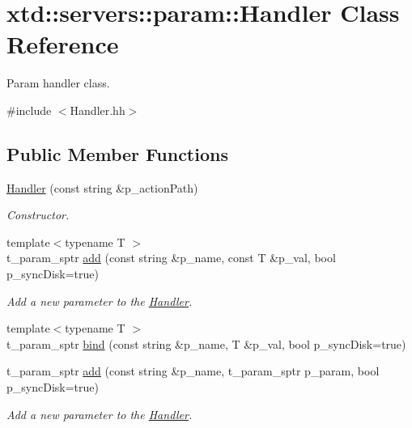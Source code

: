 \hypertarget{classxtd_1_1servers_1_1param_1_1Handler}{}\section{xtd\+:\+:servers\+:\+:param\+:\+:Handler Class Reference}
\label{classxtd_1_1servers_1_1param_1_1Handler}


Param handler class.  




{\ttfamily \#include $<$Handler.\+hh$>$}

\subsection*{Public Member Functions}
\begin{DoxyCompactItemize}
\item 
\hyperlink{classxtd_1_1servers_1_1param_1_1Handler_a93996915b562641b4673381c9abfae7b}{Handler} (const string \&p\+\_\+action\+Path)
\begin{DoxyCompactList}\small\item\em Constructor. \end{DoxyCompactList}\item 
{\footnotesize template$<$typename T $>$ }\\t\+\_\+param\+\_\+sptr \hyperlink{classxtd_1_1servers_1_1param_1_1Handler_a53a10d8d422013e62363e0d28d4e9017}{add} (const string \&p\+\_\+name, const T \&p\+\_\+val, bool p\+\_\+sync\+Disk=true)
\begin{DoxyCompactList}\small\item\em Add a new parameter to the \hyperlink{classxtd_1_1servers_1_1param_1_1Handler}{Handler}. \end{DoxyCompactList}\item 
{\footnotesize template$<$typename T $>$ }\\t\+\_\+param\+\_\+sptr \hyperlink{classxtd_1_1servers_1_1param_1_1Handler_a3bc858ae5bb7b6ce1f4d0a5eb327d17f}{bind} (const string \&p\+\_\+name, T \&p\+\_\+val, bool p\+\_\+sync\+Disk=true)
\item 
t\+\_\+param\+\_\+sptr \hyperlink{classxtd_1_1servers_1_1param_1_1Handler_a72a575bef0683ae6197c9f34cdf31d8f}{add} (const string \&p\+\_\+name, t\+\_\+param\+\_\+sptr p\+\_\+param, bool p\+\_\+sync\+Disk=true)
\begin{DoxyCompactList}\small\item\em Add a new parameter to the \hyperlink{classxtd_1_1servers_1_1param_1_1Handler}{Handler}. \end{DoxyCompactList}\item 

\end{DoxyCompactItemize}
